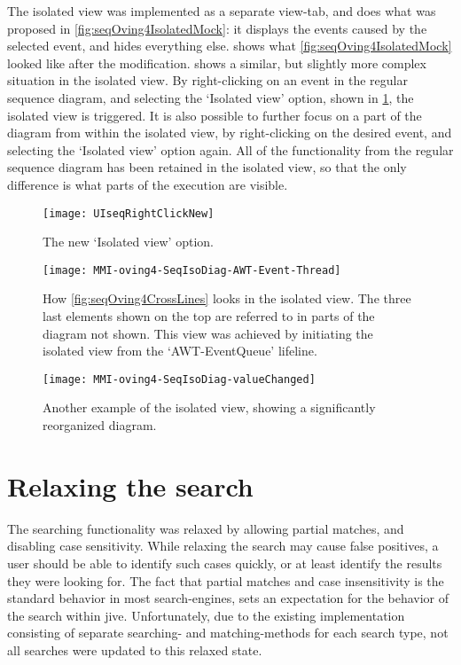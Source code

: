 The isolated view was implemented as a separate view-tab, and does what was proposed in \cref{fig:seqOving4IsolatedMock}: it displays the events caused by the selected event, and hides everything else.
 shows what \cref{fig:seqOving4IsolatedMock} looked like after the modification.
 shows a similar, but slightly more complex situation in the isolated view.
By right-clicking on an event in the regular sequence diagram, and selecting the `Isolated view' option, shown in \cref{fig:UISeqRightClickNew}, the isolated view is triggered.
It is also possible to further focus on a part of the diagram from within the isolated view, by right-clicking on the desired event, and selecting the `Isolated view' option again.
All of the functionality from the regular sequence diagram has been retained in the isolated view, so that the only difference is what parts of the execution are visible.
\begin{figure}[H]
	\centering
	\texttt{[image: UIseqRightClickNew]}
	\caption{The new `Isolated view' option.}
	\label{fig:UISeqRightClickNew}
\end{figure}

\begin{figure}[H]
	\centering
	\texttt{[image: MMI-oving4-SeqIsoDiag-AWT-Event-Thread]}
	\caption[How \cref{fig:seqOving4CrossLines} looks in the isolated view.]{How \cref{fig:seqOving4CrossLines} looks in the isolated view. The three last elements shown on the top are referred to in parts of the diagram not shown. This view was achieved by initiating the isolated view from the `AWT-EventQueue' lifeline.}
	\label{fig:MMI-oving4-SeqIsoDiag-AWT-Event-Thread}
\end{figure}

\begin{figure}[H]
	\centering
	\texttt{[image: MMI-oving4-SeqIsoDiag-valueChanged]}
	\caption{Another example of the isolated view, showing a significantly reorganized diagram.}
	\label{fig:MMI-oving4-SeqIsoDiag-valueChanged}
\end{figure}

\section{Relaxing the search}\label{implSearch}
The searching functionality was relaxed by allowing partial matches, and disabling case sensitivity.
While relaxing the search may cause false positives, a user should be able to identify such cases quickly, or at least identify the results they were looking for.
The fact that partial matches and case insensitivity is the standard behavior in most search-engines, sets an expectation for the behavior of the search within \gls{jive}.
Unfortunately, due to the existing implementation consisting of separate searching- and matching-methods for each search type, not all searches were updated to this relaxed state.

